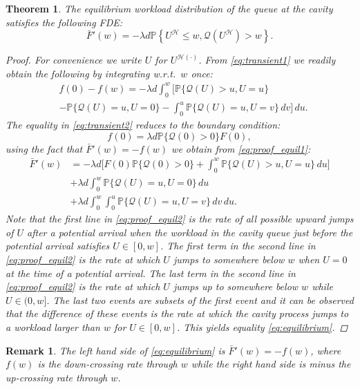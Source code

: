 \documentclass[12pt]{report}
\newtheorem{theorem}{Theorem}
\newtheorem{remark}{Remark}
\begin{document}
\begin{theorem}\label{thm:equil_general}
The equilibrium workload distribution of the queue at the cavity satisfies the following FDE:
\begin{equation}
\bar F'(w)= -\lambda d \mathbb{P}\left\{U^{\mathcal{H}} \leq w, \mathcal{Q}(U^{\mathcal{H}}) > w\right\}. \label{eq:equilibrium}
\end{equation}
\begin{proof}
For convenience we write $U$ for $U^{\mathcal{H}(\cdot)}$. From \eqref{eq:transient1} we readily obtain the following by integrating w.r.t.~$w$ once:
\begin{align}
&f(0) - f(w) = -\lambda d \int_0^w \bigg[ \mathbb{P}\{ \mathcal{Q}(U)>u, U=u\}\nonumber\\
&-\mathbb{P}\{\mathcal{Q}(U) =u, U=0\} - \int_0^u \mathbb{P}\{\mathcal{Q}(U) = u, U=v\}\,dv \bigg]\, du. \label{eq:proof_equil1}
\end{align}
The equality in \eqref{eq:transient2} reduces to the boundary condition:
$$f(0)=\lambda d \mathbb{P}\{\mathcal{Q}(0) > 0\} F(0),$$
using the fact that $\bar F'(w)= - f(w)$ we obtain from \eqref{eq:proof_equil1}:
\begin{align}
\bar F'(w)
&= -\lambda d \bigg[ F(0) \mathbb{P}\{\mathcal{Q}(0) > 0\} + \int_0^w \mathbb{P}\{\mathcal{Q}(U) > u, U=u\} \, du\bigg]\nonumber\\
&+\lambda d\int_0^w \mathbb{P}\{\mathcal{Q}(U)=u, U=0\}\, du \nonumber\\
&+ \lambda d \int_0^w \int_0^u \mathbb{P}\{\mathcal{Q}(U)=u, U=v\}\, dv \, du.\label{eq:proof_equil2}
\end{align}
Note that the first line in \eqref{eq:proof_equil2} is the rate of all possible upward jumps of $U$ after a potential arrival when the workload in the cavity queue just before the potential arrival satisfies $U\in [0,w]$. The first term in the second line in \eqref{eq:proof_equil2} is the rate at which $U$ jumps to somewhere below $w$ when $U=0$ at the time of a potential arrival. The last term in the second line in \eqref{eq:proof_equil2} is the rate at which $U$ jumps up to somewhere below $w$ while $U\in (0,w]$. The last two events are subsets of the first event and it can be observed that the difference of these events is the rate at which the cavity process jumps to a workload larger than $w$ for $U\in [0,w]$. This yields equality \eqref{eq:equilibrium}.
\end{proof}
\end{theorem}
\begin{remark}
The left hand side of \eqref{eq:equilibrium} is $\bar F'(w) = -f(w)$, where $f(w)$ is  the down-crossing rate through $w$ while the right hand side is minus the up-crossing rate through $w$. 
\end{remark}
\end{document}
